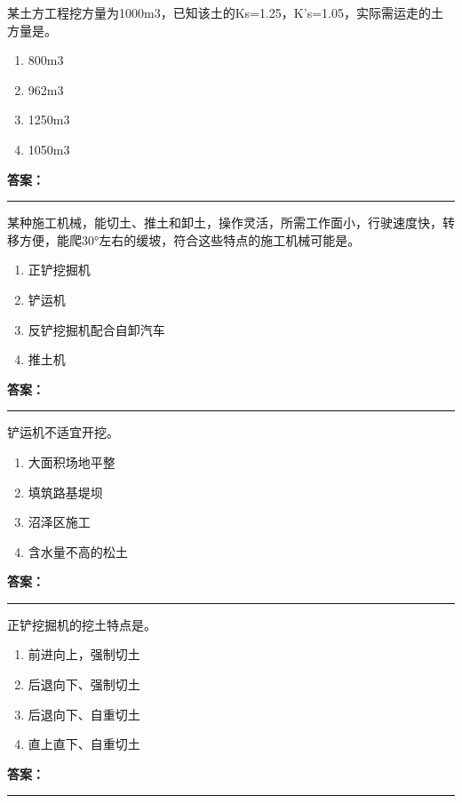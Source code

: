 \documentclass[UTF8,fontset=fandol,11pt]{ctexart}
\newcommand{\answerline}{\textcolor{answerred}{\rule{2.4cm}{0.7pt}}}
\begin{document}
\begin{quizbox}[title={第 3 题}]
某土方工程挖方量为1000m3，已知该土的Ks=1.25，K’s=1.05，实际需运走的土方量是。\\
\begin{enumerate}[label=\Alph*.]
\item 800m3
\item 962m3
\item 1250m3
\item 1050m3
\end{enumerate}
\textbf{\textcolor{answerred}{答案：}} \answerline
\end{quizbox}

\begin{quizbox}[title={第 4 题}]
某种施工机械，能切土、推土和卸土，操作灵活，所需工作面小，行驶速度快，转移方便，能爬30°左右的缓坡，符合这些特点的施工机械可能是。\\
\begin{enumerate}[label=\Alph*.]
\item 正铲挖掘机
\item 铲运机
\item 反铲挖掘机配合自卸汽车
\item 推土机
\end{enumerate}
\textbf{\textcolor{answerred}{答案：}} \answerline
\end{quizbox}

\begin{quizbox}[title={第 5 题}]
铲运机不适宜开挖。\\
\begin{enumerate}[label=\Alph*.]
\item 大面积场地平整
\item 填筑路基堤坝
\item 沼泽区施工
\item 含水量不高的松土
\end{enumerate}
\textbf{\textcolor{answerred}{答案：}} \answerline
\end{quizbox}

\begin{quizbox}[title={第 6 题}]
正铲挖掘机的挖土特点是。\\
\begin{enumerate}[label=\Alph*.]
\item 前进向上，强制切土
\item 后退向下、强制切土
\item 后退向下、自重切土
\item 直上直下、自重切土
\end{enumerate}
\textbf{\textcolor{answerred}{答案：}} \answerline
\end{quizbox}
\end{document}
